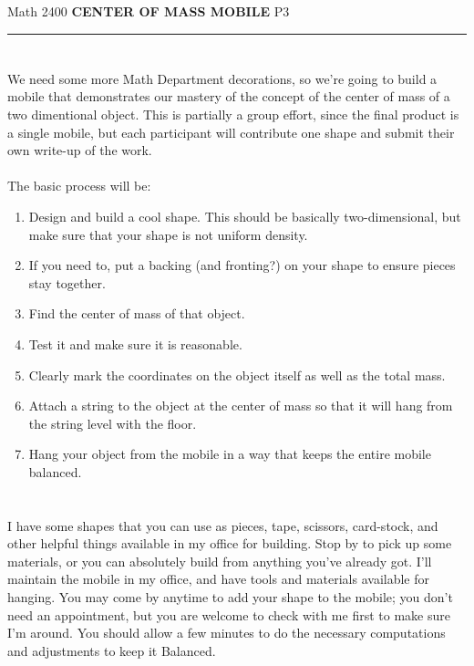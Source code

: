 \documentclass[a4paper,10pt]{article}
\begin{document}
\pagestyle{empty}
\begin{center}

Math 2400 \hspace{2cm} \textbf{\LARGE CENTER OF MASS MOBILE} \hspace{2cm} P3
\end{center}
\hrule
\section*{}
We need some more Math Department decorations, so we're going to build a mobile that demonstrates our mastery of the concept of the center of mass of a two dimentional object. This is partially a group effort, since the final product is a single mobile, but each participant will contribute one shape and submit their own write-up of the work.
\\
\\


The basic process will be:\\
\begin{enumerate}
\item Design and build a cool shape. This should be basically two-dimensional, but make sure that your shape is not uniform density.
\item If you need to, put a backing (and fronting?) on your shape to ensure pieces stay together.
\item Find the center of mass of that object. 
\item Test it and make sure it is reasonable. 
\item Clearly mark the coordinates on the object itself as well as the total mass.
\item Attach a string to the object at the center of mass so that it will hang from the string level with the floor.
\item Hang your object from the mobile in a way that keeps the entire mobile balanced.

\end{enumerate}

\section*{}
I have some shapes that you can use as pieces, tape, scissors, card-stock, and other helpful things available in my office for building. Stop by to pick up some materials, or you can absolutely build from anything you've already got. I'll maintain the mobile in my office, and have tools and materials available for hanging. You may come by anytime to add your shape to the mobile; you don't need an appointment, but you are welcome to check with me first to make sure I'm around. You should allow a few minutes to do the necessary computations and adjustments to keep it Balanced. \\
\end{document}
